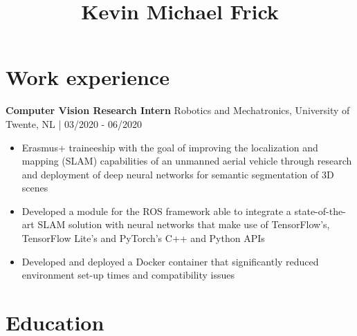 \documentclass[10pt, a4paper]{extarticle}
\title{Kevin Michael Frick}
\author{}
\begin{document}
  \maketitle
  \vspace{-0.8em}
  \hrulefill

  \section*{Work experience}
  \textbf{Computer Vision Research Intern} \hfill Robotics and Mechatronics, University of Twente, NL | 03/2020 - 06/2020

  \begin{itemize}
    \item Erasmus+ traineeship with the goal of improving the localization and mapping (SLAM) capabilities of an unmanned aerial vehicle through research and deployment of deep neural networks for semantic segmentation of 3D scenes
    \item Developed a module for the ROS framework able to integrate a state-of-the-art SLAM solution with neural networks that make use of TensorFlow's, TensorFlow Lite's and PyTorch's C++ and Python APIs
    \item Developed and deployed a Docker container that significantly reduced environment set-up times and compatibility issues
  \end{itemize}

  \section*{Education}
\end{document}
